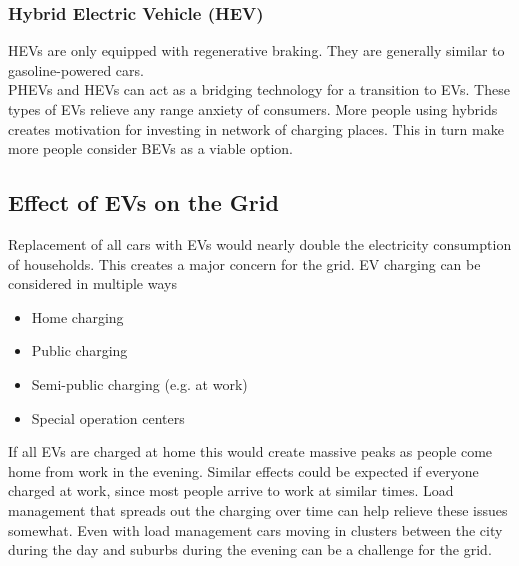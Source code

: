 \subsubsection{Hybrid Electric Vehicle (HEV)}
HEVs are only equipped with regenerative braking.
They are generally similar to gasoline-powered cars.\\

PHEVs and HEVs can act as a bridging technology for a transition to EVs.
These types of EVs relieve any range anxiety of consumers.
More people using hybrids creates motivation for investing in network of charging places.
This in turn make more people consider BEVs as a viable option.

\subsection{Effect of EVs on the Grid}
Replacement of all cars with EVs would nearly double the electricity consumption of households.
This creates a major concern for the grid.
EV charging can be considered in multiple ways

\begin{itemize}
    \item Home charging
    \item Public charging
    \item Semi-public charging (e.g. at work)
    \item Special operation centers
\end{itemize}

If all EVs are charged at home this would create massive peaks as people come home from work in the evening.
Similar effects could be expected if everyone charged at work, since most people arrive to work at similar times.
Load management that spreads out the charging over time can help relieve these issues somewhat.
Even with load management cars moving in clusters between the city during the day and suburbs during the evening can be a challenge for the grid.



